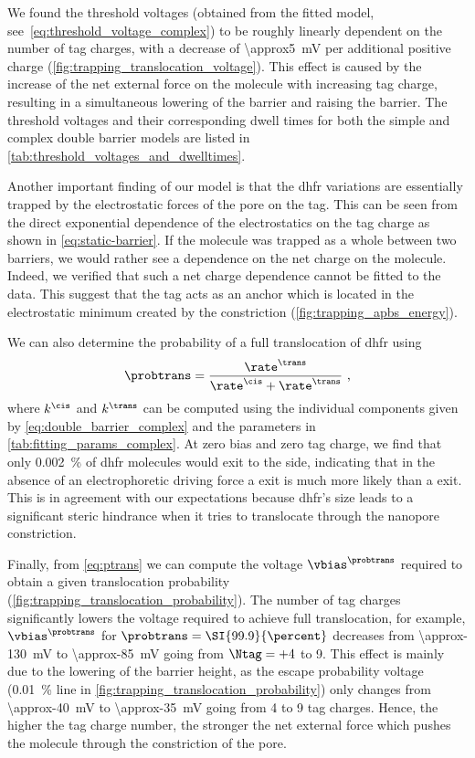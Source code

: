 We found the threshold voltages (obtained from the fitted model, see~\cref{eq:threshold_voltage_complex}) to
be roughly linearly dependent on the number of tag charges, with a decrease of \SI{\approx5}{\mV} per
additional positive charge (\cref{fig:trapping_translocation_voltage}). This effect is caused by the increase
of the net external force on the molecule with increasing tag charge, resulting in a simultaneous lowering of
the \transi{} barrier and raising the \cisi{} barrier. The threshold voltages and their corresponding
dwell times for both the simple and complex double barrier models are listed in
\cref{tab:threshold_voltages_and_dwelltimes}.

Another important finding of our model is that the \gls{dhfr} variations are essentially trapped by the
electrostatic forces of the pore on the tag. This can be seen from the direct exponential dependence of the
electrostatics on the tag charge as shown in \cref{eq:static-barrier}. If the molecule was trapped as a whole
between two barriers, we would rather see a dependence on the net charge on the molecule. Indeed, we verified
that such a net charge dependence cannot be fitted to the data. This suggest that the tag acts as an anchor
which is located in the electrostatic minimum created by the \transi{} constriction
(\cref{fig:trapping_apbs_energy}).

We can also determine the probability of a full translocation of \gls{dhfr} using
%
\begin{align}\label{eq:ptrans}
  \probtrans = \dfrac{\rate^{\trans}}{\rate^{\cis} + \rate^{\trans}}
  \text{ ,}
\end{align}
%
where $k^\cis$ and $k^\trans$ can be computed using the individual components given by
\cref{eq:double_barrier_complex} and the parameters in \cref{tab:fitting_params_complex}. At zero bias and
zero tag charge, we find that only \SI{0.002}{\percent} of \gls{dhfr} molecules would exit to the \transi{}
side, indicating that in the absence of an electrophoretic driving force a \cisi{} exit is much more likely
than a \transi{} exit. This is in agreement with our expectations because \gls{dhfr}'s size leads to a
significant steric hindrance when it tries to translocate through the nanopore constriction.

Finally, from \cref{eq:ptrans} we can compute the voltage $\vbias^{\probtrans}$ required to obtain a given
translocation probability (\cref{fig:trapping_translocation_probability}). The number of tag charges
significantly lowers the voltage required to achieve full translocation, for example, $\vbias^{\probtrans}$
for $\probtrans = \SI{99.9}{\percent}$ decreases from \SI{\approx-130}{\mV} to \SI{\approx-85}{\mV} going from
$\Ntag = +4$ to \num{+9}. This effect is mainly due to the lowering of the \transi{} barrier height, as the
\cisi{} escape probability voltage (\SI{0.01}{\percent} line in \cref{fig:trapping_translocation_probability})
only changes from \SI{\approx-40}{\mV} to \SI{\approx-35}{\mV} going from \num{+4} to \num{+9} tag charges.
Hence, the higher the tag charge number, the stronger the net external force which pushes the molecule through
the \transi{} constriction of the pore.

